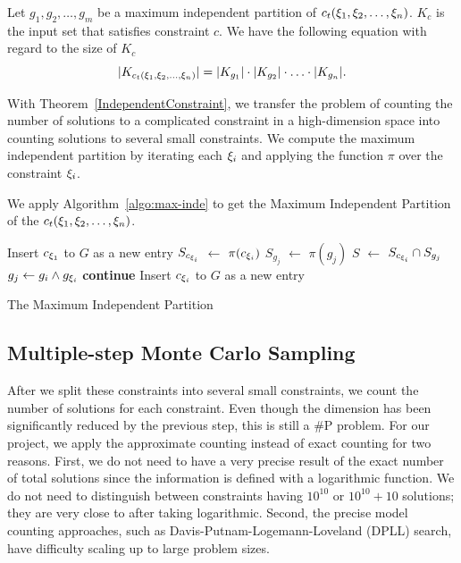 \begin{theorem}
    \label{IndependentConstraint}
    Let $g_{1}, g_{2}, \ldots, g_{m}$ be a maximum independent partition of
    $c_t({\xi}_{1},{\xi}_{2},\ldots,{\xi}_{n})$.
    $K_c$ is the input set that satisfies constraint $c$. We have the following
    equation with regard to the size of $K_c$
    $$|K_{c_t({\xi}_{1},{\xi}_{2},\ldots,{\xi}_{n})}| = |K_{g_{1}}| \cdot |K_{g_{2}}| \cdot \ldots \cdot|K_{g_{n}}|.$$
\end{theorem}
With Theorem~\ref{IndependentConstraint}, we transfer the problem of counting the number of solutions to a complicated constraint in a high-dimension
space into counting solutions to several small constraints. We compute the maximum independent partition by iterating each ${\xi}_{i}$ and applying the function $\pi$ over the constraint ${\xi}_{i}$.

We apply 
Algorithm~\ref{algo:max-inde} to get the Maximum Independent Partition of the
$c_t({\xi}_{1},{\xi}_{2},\ldots,{\xi}_{n})$.


\IncMargin{1em}
\begin{algorithm}[th]\normalsize
    \DontPrintSemicolon
    Insert $c_{{\xi}_{1}}$ to $G$ as a new entry \;
    {
        $S_{c_{{\xi}_{i}}}$ $\leftarrow$ $\pi(c_{{\xi}_{i}})$ \;
        {
            $S_{g_j}$ $\leftarrow$ $\pi(g_{j})$ \;
            $S$ $\leftarrow$ $S_{c_{{\xi}_{i}}} \cap S_{g_j}$  \;
            {
                $g_{j} \leftarrow g_{i} \land g_{{\xi}_{i}}$ \;
                \textbf{continue} \;
            }
            Insert $c_{{\xi}_{i}}$ to $G$ as a new entry \;
        }
    }
    \caption{The Maximum Independent Partition}
    \label{algo:max-inde}
\end{algorithm}
\DecMargin{1em}


\subsection{Multiple-step Monte Carlo Sampling}

After we split these constraints into several small constraints, we count the number of solutions for each constraint. Even though the dimension has been
significantly reduced by the previous step, this is still a \#P problem. For our project, we apply the approximate counting instead of exact counting for two reasons. First, we do not need to have a very precise result of the exact number of total solutions since the information is defined with a logarithmic function. We do not need to distinguish between constraints having $10^{10}$ or $10^{10} + 10$ solutions; they are very close to after taking logarithmic. Second, the
precise model counting approaches, such as Davis-Putnam-Logemann-Loveland (DPLL)
search, have difficulty scaling up to large problem sizes.

